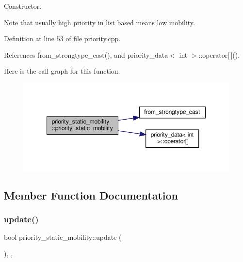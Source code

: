 Constructor. 

Note that usually high priority in list based means low mobility. 

Definition at line 53 of file priority.\+cpp.



References from\+\_\+strongtype\+\_\+cast(), and priority\+\_\+data$<$ int $>$\+::operator\mbox{[}$\,$\mbox{]}().

Here is the call graph for this function\+:
\nopagebreak
\begin{figure}[H]
\begin{center}
\leavevmode
\includegraphics[width=347pt]{db/db5/structpriority__static__mobility_a206b24a8a6340ee6b4ab25618a40a8b0_cgraph}
\end{center}
\end{figure}


\subsection{Member Function Documentation}
\mbox{\label{structpriority__static__mobility_a2657d8916b4c48c72e158fc399eb298a}} 
\subsubsection{\texorpdfstring{update()}{update()}}
{\footnotesize\ttfamily bool priority\+\_\+static\+\_\+mobility\+::update (\begin{DoxyParamCaption}{ }\end{DoxyParamCaption})\hspace{0.3cm}{\ttfamily [inline]}, {\ttfamily [override]}, {\ttfamily [virtual]}}



